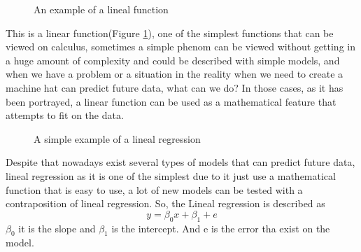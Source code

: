 \documentclass{article}
\begin{document}
\begin{figure}[h]
  \centering
{}
  \caption{An example of a lineal function}
  \label{fig:example2}
\end{figure}


This is a linear function(Figure \ref{fig:example2}),  one of the simplest functions that can be viewed on calculus, sometimes a simple phenom can be viewed without getting in a huge amount of complexity and could be described with simple models, and when we have a problem or a situation in the reality when we need to create a machine hat can predict future data, what can we do?
In those cases, as it has been portrayed, a linear function can be used as a mathematical feature that attempts to fit on the data.
\begin{figure}[h]
\centering
{}
  \caption{A simple example of a lineal regression}
  \label{fig:example3}
\end{figure}
Despite that nowadays exist several types of models that can predict future data, lineal regression as it is one of the simplest due to it just use a mathematical function that is easy to use, a lot of new models can be tested with a contraposition of lineal regression.
So, the Lineal regression is described as 
$$y=\beta_0x+\beta_1+e$$
$\beta_0$ it is the slope and $\beta_1$ is the intercept. And e is the error tha exist on the model.
\end{document}
